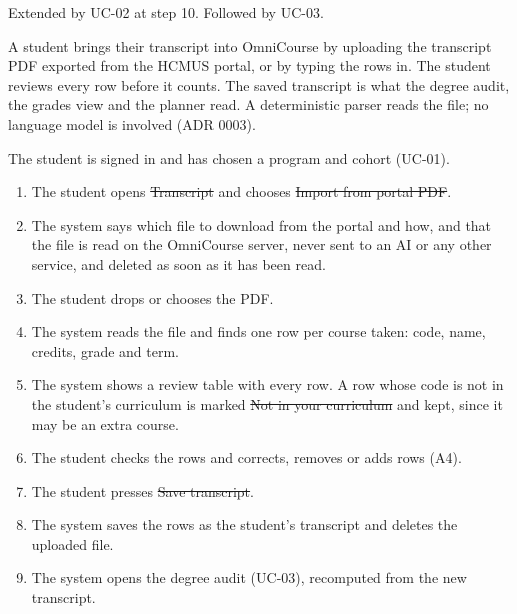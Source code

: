 Extended by UC-02 at step 10. Followed by UC-03.


A student brings their transcript into OmniCourse by uploading the transcript PDF exported from the HCMUS portal, or by
typing the rows in. The student reviews every row before it counts. The saved transcript is what the degree audit, the
grades view and the planner read. A deterministic parser reads the file; no language model is involved (ADR 0003).

The student is signed in and has chosen a program and cohort (UC-01).

\begin{enumerate}
  \item The student opens \st{Transcript} and chooses \st{Import from portal PDF}.
  \item The system says which file to download from the portal and how, and that the file is read on the OmniCourse
        server, never sent to an AI or any other service, and deleted as soon as it has been read.
  \item The student drops or chooses the PDF.
  \item The system reads the file and finds one row per course taken: code, name, credits, grade and term.
  \item The system shows a review table with every row. A row whose code is not in the student's curriculum is marked
        \st{Not in your curriculum} and kept, since it may be an extra course.
  \item The student checks the rows and corrects, removes or adds rows (A4).
  \item The student presses \st{Save transcript}.
  \item The system saves the rows as the student's transcript and deletes the uploaded file.
  \item The system opens the degree audit (UC-03), recomputed from the new transcript.
\end{enumerate}

